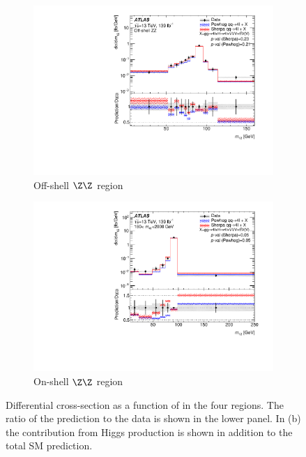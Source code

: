 \begin{figure}[htb!]
\begin{subfigure}{.49\textwidth}
      \includegraphics[width=.99\linewidth]{Figures/m4l/UnfoldedResults/Unfolded_Data_m12_m4loffshell.pdf}  
      \caption{Off-shell $\Z\Z$ region}
      \label{fig:sub-third}
    \end{subfigure}
    \begin{subfigure}{.49\textwidth}
      \centering
      \includegraphics[width=.99\linewidth]{Figures/m4l/UnfoldedResults/Unfolded_Data_m12_m4l180-2000.pdf}  
      \caption{On-shell $\Z\Z$ region}
      \label{fig:sub-fourth}
    \end{subfigure}
    \caption{Differential cross-section as a function of \mZOne{} in the four
        \mFourL{} regions. \errorbars{} \SMpredictions{} \Pvalue{} The ratio of the \SHERPA{} prediction to the data is shown in the lower panel. In (b) the contribution from Higgs production is shown in addition to the total SM prediction.}
    \label{fig:m12_m4l}
\end{figure}
